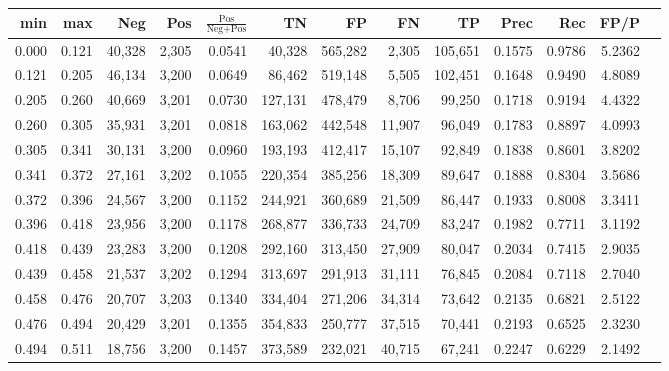 \begin{tabular}{rrrrrrrrrrrrr}
\toprule
  min &   max &    Neg &   Pos & $\frac{\text{Pos}}{\text{Neg}+\text{Pos}}$ &      TN &      FP &      FN &      TP &   Prec &    Rec &   FP/P \\
\midrule
0.000 & 0.121 & 40,328 & 2,305 &                                     0.0541 &  40,328 & 565,282 &   2,305 & 105,651 & 0.1575 & 0.9786 & 5.2362 \\
0.121 & 0.205 & 46,134 & 3,200 &                                     0.0649 &  86,462 & 519,148 &   5,505 & 102,451 & 0.1648 & 0.9490 & 4.8089 \\
0.205 & 0.260 & 40,669 & 3,201 &                                     0.0730 & 127,131 & 478,479 &   8,706 &  99,250 & 0.1718 & 0.9194 & 4.4322 \\
0.260 & 0.305 & 35,931 & 3,201 &                                     0.0818 & 163,062 & 442,548 &  11,907 &  96,049 & 0.1783 & 0.8897 & 4.0993 \\
0.305 & 0.341 & 30,131 & 3,200 &                                     0.0960 & 193,193 & 412,417 &  15,107 &  92,849 & 0.1838 & 0.8601 & 3.8202 \\
0.341 & 0.372 & 27,161 & 3,202 &                                     0.1055 & 220,354 & 385,256 &  18,309 &  89,647 & 0.1888 & 0.8304 & 3.5686 \\
0.372 & 0.396 & 24,567 & 3,200 &                                     0.1152 & 244,921 & 360,689 &  21,509 &  86,447 & 0.1933 & 0.8008 & 3.3411 \\
0.396 & 0.418 & 23,956 & 3,200 &                                     0.1178 & 268,877 & 336,733 &  24,709 &  83,247 & 0.1982 & 0.7711 & 3.1192 \\
0.418 & 0.439 & 23,283 & 3,200 &                                     0.1208 & 292,160 & 313,450 &  27,909 &  80,047 & 0.2034 & 0.7415 & 2.9035 \\
0.439 & 0.458 & 21,537 & 3,202 &                                     0.1294 & 313,697 & 291,913 &  31,111 &  76,845 & 0.2084 & 0.7118 & 2.7040 \\
0.458 & 0.476 & 20,707 & 3,203 &                                     0.1340 & 334,404 & 271,206 &  34,314 &  73,642 & 0.2135 & 0.6821 & 2.5122 \\
0.476 & 0.494 & 20,429 & 3,201 &                                     0.1355 & 354,833 & 250,777 &  37,515 &  70,441 & 0.2193 & 0.6525 & 2.3230 \\
0.494 & 0.511 & 18,756 & 3,200 &                                     0.1457 & 373,589 & 232,021 &  40,715 &  67,241 & 0.2247 & 0.6229 & 2.1492 \\

\end{tabular}
